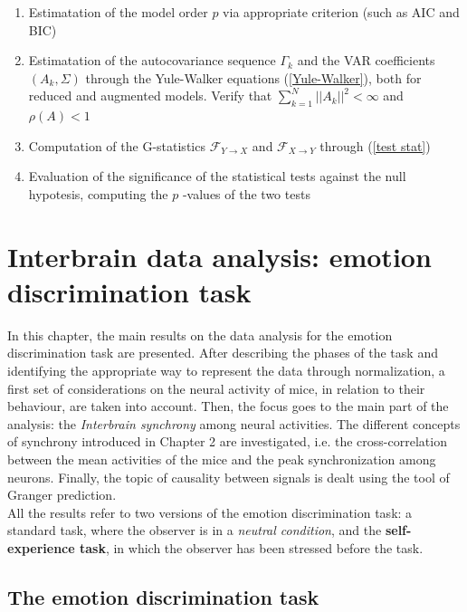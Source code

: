 \documentclass[12pt, a4paper]{report}
\begin{document}
\begin{enumerate}
	\item Estimatation of the model order $p$ via appropriate criterion (such as AIC and BIC)
	
	\item Estimatation of the autocovariance sequence $\Gamma_k$ and the VAR coefficients $(A_k, \Sigma)$ through the Yule-Walker equations (\ref{Yule-Walker}), both for reduced and augmented models. Verify that $ \sum_{k=1}^{N}||A_k||^2 < \infty $ and  $\rho(A) < 1$
	
	\item Computation of the G-statistics $ \mathcal{F}_{Y \rightarrow X} $ and $ \mathcal{F}_{X \rightarrow Y} $ through (\ref{test stat})
	
	\item Evaluation of the significance of the statistical tests against the null hypotesis, computing the $p$ -values of the two tests 
	
\end{enumerate}





\newpage
\chapter{Interbrain data analysis: emotion discrimination task}

In this chapter, the main results on the data analysis for the emotion discrimination task are presented. After describing the phases of the task and identifying the appropriate way  to represent the data through normalization, a first set of considerations on the neural activity of mice, in relation to their behaviour, are taken into account. Then, the focus goes to the main part of the analysis: the \textit{Interbrain synchrony} among neural activities. The different concepts of synchrony introduced in Chapter 2 are  investigated, i.e. the cross-correlation between the mean activities of the mice and the peak synchronization among neurons. Finally, the topic of causality between signals is dealt using the tool of Granger prediction.\\
All the results refer to two versions of the emotion discrimination task: a standard task, where the observer is in a \textit{neutral condition}, and the \textbf{self-experience task}, in which the observer has been stressed before the task.


\section{The emotion discrimination task}
\end{document}
